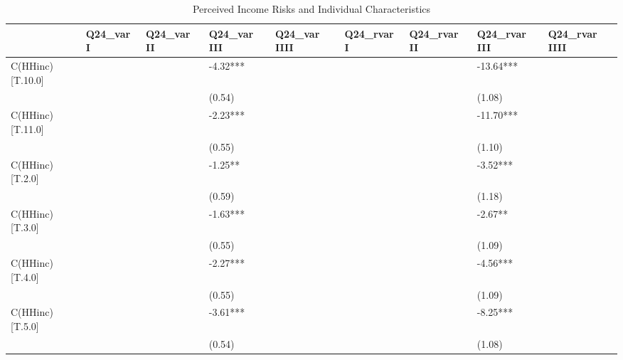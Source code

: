 \documentclass[12pt,notitlepage,onecolumn,aps,pra]{revtex4-1}
\begin{document}
       
\begin{table}[ht]
\begin{adjustbox}{width={15cm},totalheight={20cm}}
\begin{threeparttable}
\caption{Perceived Income Risks and Individual Characteristics}
\label{micro_reg}\begin{tabular}{lllllllll}
\toprule
{} & Q24\_var I & Q24\_var II & Q24\_var III & Q24\_var IIII & Q24\_rvar I & Q24\_rvar II & Q24\_rvar III & Q24\_rvar IIII \\
\midrule
C(HHinc)[T.10.0]   &           &            &    -4.32*** &              &            &             &    -13.64*** &               \\
                   &           &            &      (0.54) &              &            &             &       (1.08) &               \\
C(HHinc)[T.11.0]   &           &            &    -2.23*** &              &            &             &    -11.70*** &               \\
                   &           &            &      (0.55) &              &            &             &       (1.10) &               \\
C(HHinc)[T.2.0]    &           &            &     -1.25** &              &            &             &     -3.52*** &               \\
                   &           &            &      (0.59) &              &            &             &       (1.18) &               \\
C(HHinc)[T.3.0]    &           &            &    -1.63*** &              &            &             &      -2.67** &               \\
                   &           &            &      (0.55) &              &            &             &       (1.09) &               \\
C(HHinc)[T.4.0]    &           &            &    -2.27*** &              &            &             &     -4.56*** &               \\
                   &           &            &      (0.55) &              &            &             &       (1.09) &               \\
C(HHinc)[T.5.0]    &           &            &    -3.61*** &              &            &             &     -8.25*** &               \\
                   &           &            &      (0.54) &              &            &             &       (1.08) &               \\

\end{tabular}
\end{threeparttable}
\end{adjustbox}
\end{table}
\end{document}
